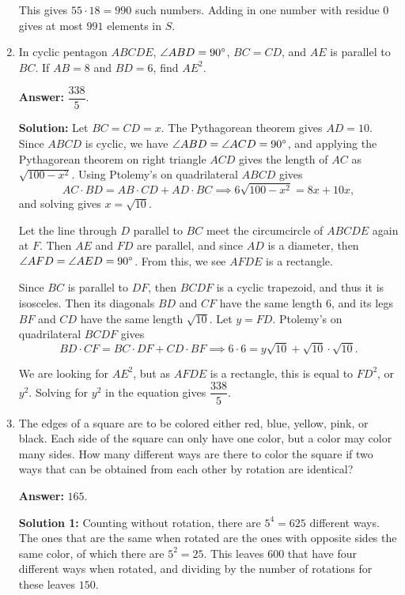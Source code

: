 \documentclass[11pt,paper=letter]{scrartcl}
\begin{document}
\begin{enumerate}[left=0pt]
This gives $55 \cdot 18 = 990$ such numbers. Adding in one number with residue $0$ gives at most $991$ elements in $S$.

\item In cyclic pentagon $ABCDE$, $\angle ABD = 90^\circ$, $BC = CD$, and $AE$ is parallel to $BC$. If $AB = 8$ and $BD = 6$, find $AE^2$.

\textbf{Answer:} $\boxed{\dfrac{338}5}$.

\textbf{Solution:} Let $BC = CD = x$. The Pythagorean theorem gives $AD = 10$. Since $ABCD$ is cyclic, we have $\angle ABD = \angle ACD = 90^\circ$, and applying the Pythagorean theorem on right triangle $ACD$ gives the length of $AC$ as $\sqrt{100-x^2}$. Using Ptolemy's on quadrilateral $ABCD$ gives $$AC \cdot BD = AB \cdot CD + AD \cdot BC \implies 6\sqrt{100-x^2} = 8x + 10x,$$ and solving gives $x = \sqrt{10}$.

Let the line through $D$ parallel to $BC$ meet the circumcircle of $ABCDE$ again at $F$. Then $AE$ and $FD$ are parallel, and since $AD$ is a diameter, then $\angle AFD = \angle AED = 90^\circ$. From this, we see $AFDE$ is a rectangle. 

Since $BC$ is parallel to $DF$, then $BCDF$ is a cyclic trapezoid, and thus it is isosceles. Then its diagonals $BD$ and $CF$ have the same length $6$, and its legs $BF$ and $CD$ have the same length $\sqrt{10}$. Let $y = FD$. Ptolemy's on quadrilateral $BCDF$ gives $$BD \cdot CF = BC \cdot DF + CD \cdot BF \implies 6\cdot6 = y\sqrt{10} + \sqrt{10} \cdot \sqrt{10}.$$

We are looking for $AE^2$, but as $AFDE$ is a rectangle, this is equal to $FD^2$, or $y^2$. Solving for $y^2$ in the equation gives $\dfrac{338}5$.

\item The edges of a square are to be colored either red, blue, yellow, pink, or black. Each side of the square can only have one color, but a color may color many sides. How many different ways are there to color the square if two ways that can be obtained from each other by rotation are identical?

\textbf{Answer:} $\boxed{165}$.

\textbf{Solution 1:} Counting without rotation, there are $5^4 = 625$ different ways. The ones that are the same when rotated are the ones with opposite sides the same color, of which there are $5^2 = 25$. This leaves $600$ that have four different ways when rotated, and dividing by the number of rotations for these leaves $150$.


\end{enumerate}
\end{document}
